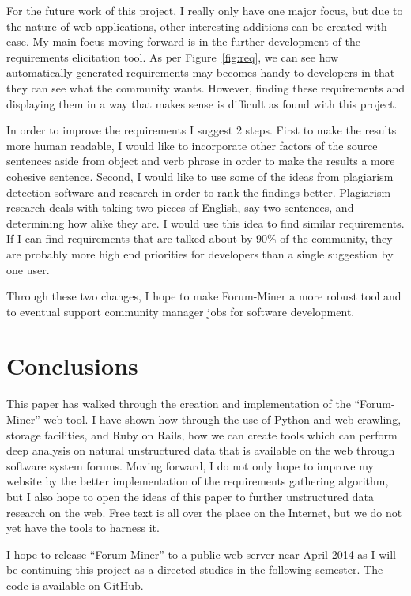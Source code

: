 \documentclass[conference]{IEEEtran}
\begin{document}
For the future work of this project, I really only have one major focus, but due to the nature of web applications,
other interesting additions can be created with ease. My main focus moving forward is in the further development
of the requirements elicitation tool. As per Figure~\ref{fig:req}, we can see how automatically generated
requirements may becomes handy to developers in that they can see what the community wants. However, finding 
these requirements and displaying them in a way that makes sense is difficult as found with this project.

In order to improve the requirements I suggest 2 steps. First to make the results more human readable, I would
like to incorporate other factors of the source sentences aside from object and verb phrase in order to make
the results a more cohesive sentence. Second, I would like to use some of the ideas from plagiarism detection
software and research in order to rank the findings better. Plagiarism research deals with taking two pieces of
English, say two sentences, and determining how alike they are. I would use this idea to find similar requirements.
If I can find requirements that are talked about by 90\% of the community, they are probably more high end priorities
for developers than a single suggestion by one user.

Through these two changes, I hope to make Forum-Miner a more robust tool and to eventual support community manager
jobs for software development.

\section{Conclusions}
\label{sec:conc}

This paper has walked through the creation and implementation of the ``Forum-Miner'' web tool. I have shown
how through the use of Python and web crawling, storage facilities, and Ruby on Rails, how we can create tools
which can perform deep analysis on natural unstructured data
that is available on the web through software system forums. Moving forward, I do not only hope to improve my
website by the better implementation of the requirements gathering algorithm, but I also hope to open the ideas
of this paper to further unstructured data research on the web. Free text is all over the place on the Internet,
but we do not yet have the tools to harness it.

I hope to release ``Forum-Miner'' to a public web server near April 2014 as I will be continuing this project
as a directed studies in the following semester. The code is available on GitHub.

\end{document}
